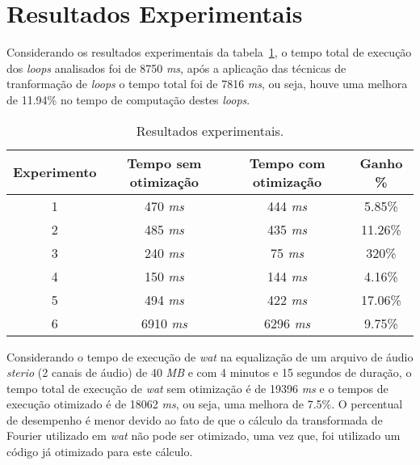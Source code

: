 \section{Resultados Experimentais}

Considerando os resultados experimentais da tabela~\ref{tabela_resultados},
o tempo total de execução dos \textit{loops} analisados foi de 8750 \textit{ms},
após a aplicação das técnicas de tranformação de \textit{loops} o tempo total
foi de 7816 \textit{ms}, ou seja, houve uma melhora de 11.94\% no tempo de  
computação destes \textit{loops}.

\begin{table}[h]
  \caption{Resultados experimentais.}
  \label{tabela_resultados}
\begin{center}
  \begin{tabular}{c|c|c|c}
    Experimento & Tempo sem otimização & Tempo com otimização & Ganho \%\\
    \hline
    1 & 470 \textit{ms} & 444 \textit{ms} & 5.85\% \\
    \hline
    2 & 485 \textit{ms} & 435 \textit{ms} & 11.26\% \\
    \hline
    3 & 240 \textit{ms} & 75 \textit{ms} & 320\% \\
    \hline
    4 & 150 \textit{ms} & 144 \textit{ms} & 4.16\% \\
    \hline
    5 & 494 \textit{ms} & 422 \textit{ms} & 17.06\% \\
    \hline
    6 & 6910 \textit{ms} & 6296 \textit{ms} & 9.75\% \\
    \hline
  \end{tabular}
\end{center}
\end{table}

Considerando o tempo de execução de \textit{wat} na equalização de um
arquivo de áudio \textit{sterio} (2 canais de áudio) de 40 \textit{MB} e
com 4 minutos e 15 segundos de duração, o tempo total de execução de \textit{wat} 
sem otimização é de 19396 \textit{ms} 
e o tempos de execução otimizado é de 18062 \textit{ms}, ou seja, uma melhora de 
7.5\%. 
O percentual de desempenho é menor devido ao fato de que o cálculo da
transformada de Fourier \cite{fft} utilizado em \textit{wat} não pode ser otimizado, uma
vez que, foi utilizado um código já otimizado para este cálculo.
